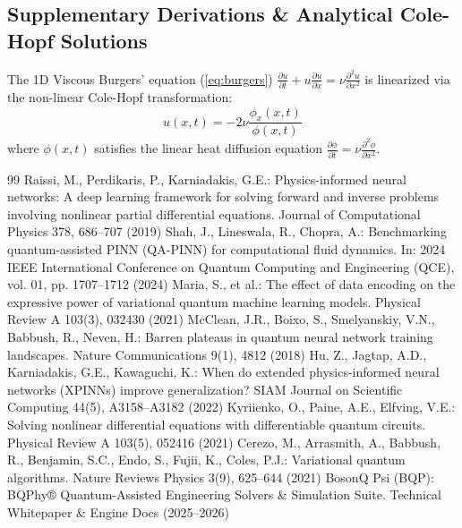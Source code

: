 \documentclass[pdflatex,sn-jnl]{sn-jnl}%
\begin{document}
\begin{appendices}
\section{Supplementary Derivations \& Analytical Cole-Hopf Solutions}\label{secA1}
The 1D Viscous Burgers' equation (\ref{eq:burgers}) $\frac{\partial u}{\partial t} + u \frac{\partial u}{\partial x} = \nu \frac{\partial^2 u}{\partial x^2}$ is linearized via the non-linear Cole-Hopf transformation:
\begin{equation}\label{eq:cole_hopf}
u(x,t) = -2\nu \frac{\phi_x(x,t)}{\phi(x,t)}
\end{equation}
where $\phi(x,t)$ satisfies the linear heat diffusion equation $\frac{\partial \phi}{\partial t} = \nu \frac{\partial^2 \phi}{\partial x^2}$.
\end{appendices}

\begin{thebibliography}{99}
 Raissi, M., Perdikaris, P., Karniadakis, G.E.: Physics-informed neural networks: A deep learning framework for solving forward and inverse problems involving nonlinear partial differential equations. Journal of Computational Physics 378, 686--707 (2019)
 Shah, J., Lineswala, R., Chopra, A.: Benchmarking quantum-assisted PINN (QA-PINN) for computational fluid dynamics. In: 2024 IEEE International Conference on Quantum Computing and Engineering (QCE), vol. 01, pp. 1707--1712 (2024)
 Maria, S., et al.: The effect of data encoding on the expressive power of variational quantum machine learning models. Physical Review A 103(3), 032430 (2021)
 McClean, J.R., Boixo, S., Smelyanskiy, V.N., Babbush, R., Neven, H.: Barren plateaus in quantum neural network training landscapes. Nature Communications 9(1), 4812 (2018)
 Hu, Z., Jagtap, A.D., Karniadakis, G.E., Kawaguchi, K.: When do extended physics-informed neural networks (XPINNs) improve generalization? SIAM Journal on Scientific Computing 44(5), A3158--A3182 (2022)
 Kyriienko, O., Paine, A.E., Elfving, V.E.: Solving nonlinear differential equations with differentiable quantum circuits. Physical Review A 103(5), 052416 (2021)
 Cerezo, M., Arrasmith, A., Babbush, R., Benjamin, S.C., Endo, S., Fujii, K., Coles, P.J.: Variational quantum algorithms. Nature Reviews Physics 3(9), 625--644 (2021)
 BosonQ Psi (BQP): BQPhy® Quantum-Assisted Engineering Solvers \& Simulation Suite. Technical Whitepaper \& Engine Docs (2025--2026)
\end{thebibliography}
\end{document}
